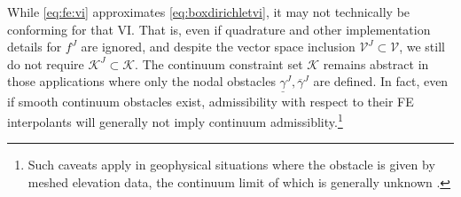 \documentclass[letterpaper,final,12pt,reqno]{amsart}
\theoremstyle{cstyle}
\theoremstyle{cstyle*}
\theoremstyle{dstyle}
\numberwithin{equation}{section}
\numberwithin{figure}{section}
\numberwithin{table}{section}
\numberwithin{theorem}{section}
\begin{document}
While \eqref{eq:fe:vi} approximates \eqref{eq:boxdirichletvi}, it may not technically be conforming for that VI.  That is, even if quadrature and other implementation details for $f^J$ are ignored, and despite the vector space inclusion $\mathcal{V}^J \subset \mathcal{V}$, we still do not require $\mathcal{K}^J \subset \mathcal{K}$.  The continuum constraint set $\mathcal{K}$ remains abstract in those applications where only the nodal obstacles $\underline{\gamma}^J, \overline{\gamma}^J$ are defined.  In fact, even if smooth continuum obstacles exist, admissibility with respect to their FE interpolants will generally not imply continuum admissiblity.\footnote{Such caveats apply in geophysical situations where the obstacle is given by meshed elevation data, the continuum limit of which is generally unknown \cite{Bueler2016}.}
\end{document}
